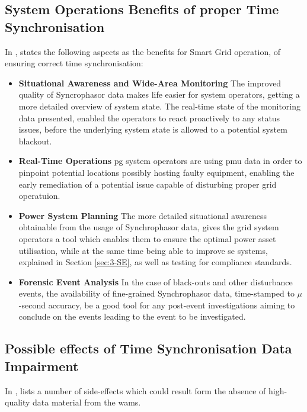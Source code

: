 \subsection[System Operations Benefits]{System Operations Benefits of proper Time Synchronisation}

In \cite{dagle2019importance}, \citeauthor{dagle2019importance} states the following aspects as the benefits for Smart Grid operation, of ensuring correct time synchronisation:


\begin{itemize}
    \item \textbf{Situational Awareness and Wide-Area Monitoring} The improved quality of Syncrophasor data makes life easier for system operators, getting a more detailed overview of system state. The real-time state of the monitoring data presented, enabled the operators to react proactively to any status issues, before the underlying system state is allowed to a potential system blackout.
    \item \textbf{Real-Time Operations} \acrshort{pg} system operators are using \acrlong{pmu} data in order to pinpoint potential locations possibly hosting faulty equipment, enabling the early remediation of a potential issue capable of disturbing proper grid operatuion.
    \item \textbf{Power System Planning} The more detailed situational awareness obtainable from the usage of Synchrophasor data, gives the grid system operators a tool which enables them to ensure the optimal power asset utilisation, while at the same time being able to improve \acrlong{se} systems, explained in Section \ref{sec:3-SE}, as well as testing for compliance standards.
    \item \textbf{Forensic Event Analysis} In the case of black-outs and other disturbance events, the availability of fine-grained Synchrophasor data, time-stamped to $\mu$-second accuracy, be a good tool for any post-event investigations aiming to conclude on the events leading to the event to be investigated.
    
\end{itemize}

\subsection{Possible effects of Time Synchronisation Data Impairment}

In \Cite{martin2019impact}, \citeauthor{martin2019impact} lists a number of side-effects which could result form the absence of high-quality data material from the \acrshort{wams}.


